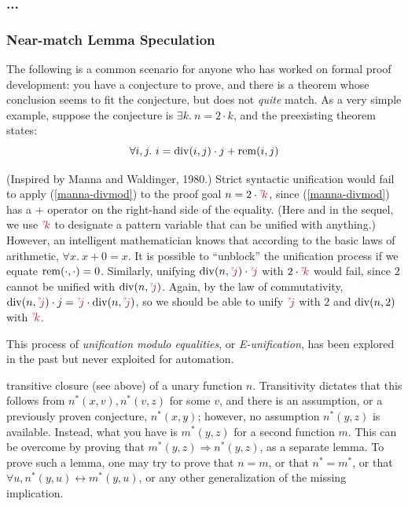 \subsubsection{...}

\subsubsection{Near-match Lemma Speculation}

The following is a common scenario for anyone who has worked on formal proof development:
you have a conjecture to prove, and there is
a theorem whose conclusion seems to fit the conjecture, but does not \emph{quite} match.
As a very simple example, suppose the conjecture is
$\exists k.~ n = 2\cdot k$, and the preexisting theorem states:
\begin{equation}\label{manna-divmod}
  \forall i, j.~ i = \mathrm{div}(i, j) \cdot j + \mathrm{rem}(i, j)
\end{equation}

(Inspired by Manna and Waldinger, 1980.)
Strict syntactic unification would fail to apply (\ref{manna-divmod}) to the proof goal $n = 2\cdot {\color{purple}^{\scriptscriptstyle?}\!{k}}$, since (\ref{manna-divmod}) has a $+$ operator on the right-hand side of the equality.
(Here and in the sequel, we use ${\color{purple}^{\scriptscriptstyle?}\!{k}}$ to designate a pattern variable that can be unified with anything.)
However, an intelligent mathematician knows that according to the basic laws of arithmetic, $\forall x.~x + 0 = x$.
It is possible to ``unblock'' the unification process if we equate $\mathrm{rem}(\cdot,\cdot) = 0$.
Similarly, unifying $\mathrm{div}(n,{\color{purple}^{\scriptscriptstyle?}\!{j}})\cdot {\color{purple}^{\scriptscriptstyle?}\!{j}}$ with $2\cdot {\color{purple}^{\scriptscriptstyle?}\!{k}}$ would fail, since $2$ cannot be unified with $\mathrm{div}(n,{\color{purple}^{\scriptscriptstyle?}\!{j}})$.
Again, by the law of commutativity, 
$\mathrm{div}(n,{\color{purple}^{\scriptscriptstyle?}\!{j}})\cdot j = {\color{purple}^{\scriptscriptstyle?}\!{j}} \cdot\mathrm{div}(n,{\color{purple}^{\scriptscriptstyle?}\!{j}})$,
so we should be able to unify ${\color{purple}^{\scriptscriptstyle?}\!{j}}$ with $2$ and $\mathrm{div}(n, 2)$ with ${\color{purple}^{\scriptscriptstyle?}\!{k}}$.

This process of \emph{unification modulo equalities}, or \emph{E-unification}, has been explored in the past but never exploited for automation\citeneeded{}.

{\color{gray}
transitive closure (see above) of a unary function $n$.
Transitivity dictates that this follows from $n^*(x,v), n^*(v,z)$ for some $v$,
and there is an assumption, or a previously proven conjecture, $n^*(x,y)$;
however, no assumption $n^*(y,z)$ is available.
Instead, what you have is $m^*(y,z)$ for a second function $m$.
This can be overcome by proving that $m^*(y,z) \Rightarrow n^*(y,z)$, as a
separate lemma.
To prove such a lemma, one may try to prove that $n=m$, or that $n^*=m^*$,
or that $\forall u, n^*(y,u)\leftrightarrow m^*(y,u)$, or any other generalization
of the missing implication.}

